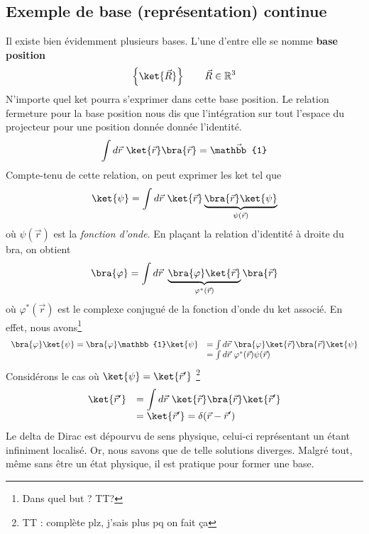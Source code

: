 \subsection{Exemple de base (représentation) continue}
Il existe bien évidemment plusieurs bases. L'une d'entre elle se nomme 
\textbf{base position}
\begin{equation}
\left\{\ket{\vec{R}}\right\}\qquad \vec{R}\in\mathbb{R}^3
\end{equation}
N'importe quel ket pourra s'exprimer dans cette base position. Le relation 
fermeture pour la base position nous dis que l'intégration sur tout l'espace
du projecteur pour une position donnée donnée l'identité.
\begin{equation}
\int d\vec{r}\ \ket{\vec{r}}\bra{\vec{r}} = \vec{\mathbb{1}}
\end{equation}
Compte-tenu de cette relation, on peut exprimer les ket tel que
\begin{equation}
\ket{\psi} = \int d\vec{r}\ \ket{\vec{r}}\underbrace{\bra{\vec{r}}\ket{
\psi}}_{\psi(\vec{r})}
\end{equation}
où $\psi(\vec{r})$ est la \textit{fonction d'onde}. En plaçant la relation 
d'identité à droite du bra, on obtient
\begin{equation}
\bra{\varphi} = \int d\vec{r}\ \underbrace{\bra{\varphi}\ket{\vec{r}}}_{
\varphi^*(\vec{r})}
\bra{\vec{r}}
\end{equation}
où $\varphi^*(\vec{r})$ est le complexe conjugué de la fonction d'onde du 
ket associé. En effet, nous avons\footnote{Dans quel but ? TT?}
\begin{equation}
\begin{array}{ll}
\bra{\varphi}\ket{\psi} = \bra{\varphi}\mathbb{1}\ket{\psi} &= \int d\vec{r}\ 
\bra{\varphi}\ket{\vec{r}}\bra{\vec{r}}\ket{\psi}\\
&= \int d\vec{r}\ \varphi^*(\vec{r})\psi(\vec{r})
\end{array}
\end{equation}
Considérons le cas où $\ket{\psi}=\ket{\vec{r}'}$ \footnote{TT : complète plz, 
j'sais plus pq on fait ça}
\begin{equation}
\begin{array}{ll}
\ket{\vec{r}'} &= \displaystyle \int d\vec{r}\ \ket{\vec{r}}\bra{\vec{r}}\ket{
\vec{r}'}\\
&=\ket{\vec{r}'} =\displaystyle \delta(\vec{r}-\vec{r}')
\end{array}
\end{equation}
Le delta de Dirac est dépourvu de sens physique, celui-ci représentant un étant 
infiniment localisé. Or, nous savons que de telle solutions diverges. Malgré tout, 
même sans être un état physique, 
il est pratique pour former une base.



